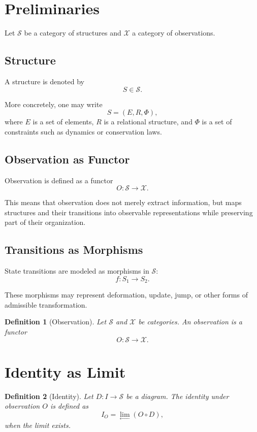\documentclass[11pt,a4paper]{article}
\newtheorem{definition}{Definition}
\begin{document}
\section{Preliminaries}

Let $\mathcal{S}$ be a category of structures and $\mathcal{X}$ a category of observations.

\subsection{Structure}

A structure is denoted by
\[
S \in \mathcal{S}.
\]

More concretely, one may write
\[
S = (E, R, \Phi),
\]
where $E$ is a set of elements, $R$ is a relational structure, and $\Phi$ is a set of constraints such as dynamics or conservation laws.

\subsection{Observation as Functor}

Observation is defined as a functor
\[
O : \mathcal{S} \to \mathcal{X}.
\]

This means that observation does not merely extract information, but maps structures and their transitions into observable representations while preserving part of their organization.

\subsection{Transitions as Morphisms}

State transitions are modeled as morphisms in $\mathcal{S}$:
\[
f : S_1 \to S_2.
\]

These morphisms may represent deformation, update, jump, or other forms of admissible transformation.

\begin{definition}[Observation]
Let $\mathcal{S}$ and $\mathcal{X}$ be categories.
An observation is a functor
\[
O : \mathcal{S} \to \mathcal{X}.
\]
\end{definition}

\section{Identity as Limit}

\begin{definition}[Identity]
Let $D : I \to \mathcal{S}$ be a diagram.
The identity under observation $O$ is defined as
\[
I_O = \lim_{\longleftarrow} (O \circ D),
\]
when the limit exists.
\end{definition}
\end{document}
